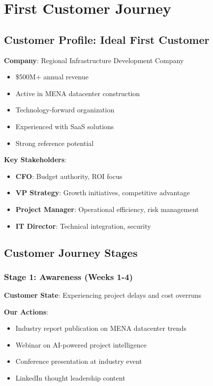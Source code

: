 \documentclass[business]{../templates/infraradar-main}
\begin{document}
\section{First Customer Journey}

\subsection{Customer Profile: Ideal First Customer}
\textbf{Company}: Regional Infrastructure Development Company
\begin{itemize}
    \item \$500M+ annual revenue
    \item Active in MENA datacenter construction
    \item Technology-forward organization
    \item Experienced with SaaS solutions
    \item Strong reference potential
\end{itemize}

\textbf{Key Stakeholders}:
\begin{itemize}
    \item \textbf{CFO}: Budget authority, ROI focus
    \item \textbf{VP Strategy}: Growth initiatives, competitive advantage
    \item \textbf{Project Manager}: Operational efficiency, risk management
    \item \textbf{IT Director}: Technical integration, security
\end{itemize}

\subsection{Customer Journey Stages}

\subsubsection{Stage 1: Awareness (Weeks 1-4)}
\textbf{Customer State}: Experiencing project delays and cost overruns

\textbf{Our Actions}:
\begin{itemize}
    \item Industry report publication on MENA datacenter trends
    \item Webinar on AI-powered project intelligence
    \item Conference presentation at industry event
    \item LinkedIn thought leadership content
\end{itemize}
\end{document}
